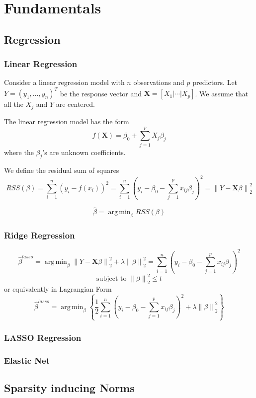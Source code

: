 \documentclass{beamer}
\theoremstyle{plain}
\theoremstyle{definition}
\newcommand{\mat}[1]{\mathbf{#1}}
\DeclareMathOperator*{\argmin}{arg\,min}
\newcommand{\norm}[1]{\left\lVert #1 \right\rVert}
\begin{document}

\section{Fundamentals}

\subsection{Regression}
\begin{frame}
\frametitle{Linear Regression}
Consider a linear regression model with $n$ observations and $p$ predictors. Let $Y = (y_1, \ldots , y_n)^T$ be the response vector and $\mat X = \left[X_1 \vert \cdots \vert X_p \right]$. We assume that all the $X_j$ and $Y$ are centered.

The linear regression model has the form
$$f(\mat X) = \beta_0 + \sum_{j=1}^p X_j\beta_j$$
where the $\beta_j$'s are unknown coefficients.

We define the residual sum of squares
$$RSS(\beta) = \sum_{i=1}^n (y_i - f(x_i))^2 = \sum_{i=1}^n (y_i - \beta_0 - \sum_{j=1}^p x_{ij}\beta_j)^2 = \norm{Y - \mat{X}\beta}_{2}^{2}$$

$$\hat{\beta} = \argmin_{\beta} RSS(\beta)$$
\end{frame}

\begin{frame}
\frametitle{Ridge Regression}
$$\hat{\beta}^{lasso} = \argmin_{\beta} \norm{Y - \mat{X}\beta}_{2}^{2} + \lambda \norm{\beta}_{2}^{2} = \sum_{i=1}^n (y_i - \beta_0 - \sum_{j=1}^p x_{ij}\beta_j)^2$$
$$\text{subject to } \norm{\beta}_{2}^2 \leq t$$
or equivalently in Lagrangian Form
$$\hat{\beta}^{lasso} = \argmin_{\beta}\left\{\frac{1}{2}\sum_{i=1}^n (y_i - \beta_0 - \sum_{j=1}^p x_{ij}\beta_j)^2 + \lambda\norm{\beta}_{2}^2 \right\}$$
\end{frame}

\begin{frame}
\frametitle{LASSO Regression}
\end{frame}

\begin{frame}
\frametitle{Elastic Net}
\end{frame}

\subsection{Sparsity inducing Norms}
\end{document}

